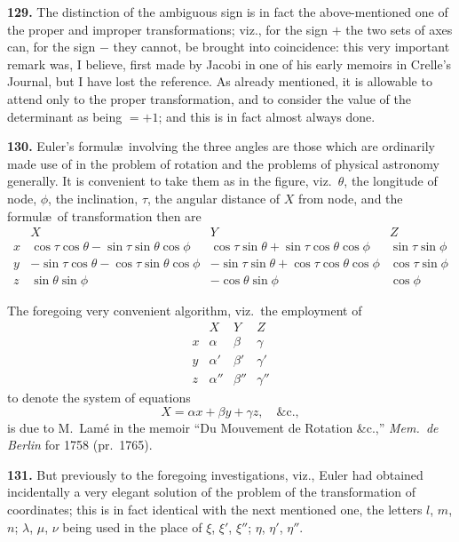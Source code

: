 \documentclass[11pt,a4paper]{article}
\theoremstyle{definition}
\begin{document}
\textbf{129.} The distinction of the ambiguous sign is in fact the above-mentioned one of the proper and improper transformations; viz., for the sign $+$ the two sets of axes can, for the sign $-$ they cannot, be brought into coincidence: this very important remark was, I believe, first made by Jacobi in one of his early memoirs in Crelle's Journal, but I have lost the reference. As already mentioned, it is allowable to attend only to the proper transformation, and to consider the value of the determinant as being $= +1$; and this is in fact almost always done.

\textbf{130.} Euler's formul\ae\ involving the three angles are those which are ordinarily made use of in the problem of rotation and the problems of physical astronomy generally. It is convenient to take them as in the figure, viz.\ $\theta$, the longitude of node, $\phi$, the inclination, $\tau$, the angular distance of $X$ from node, and the formul\ae\ of transformation then are
\[
\begin{array}{c|ccc}
& X & Y & Z \\ \hline
x & \cos\tau\cos\theta - \sin\tau\sin\theta\cos\phi & \cos\tau\sin\theta + \sin\tau\cos\theta\cos\phi & \sin\tau\sin\phi \\
y & -\sin\tau\cos\theta - \cos\tau\sin\theta\cos\phi & -\sin\tau\sin\theta + \cos\tau\cos\theta\cos\phi & \cos\tau\sin\phi \\
z & \sin\theta\sin\phi & -\cos\theta\sin\phi & \cos\phi
\end{array}
\]

The foregoing very convenient algorithm, viz.\ the employment of
\[
\begin{array}{c|ccc}
& X & Y & Z \\ \hline
x & \alpha & \beta & \gamma \\
y & \alpha' & \beta' & \gamma' \\
z & \alpha'' & \beta'' & \gamma''
\end{array}
\]
to denote the system of equations
\[
X = \alpha x + \beta y + \gamma z, \quad \&\text{c.},
\]
is due to M.~Lam\'e in the memoir ``Du Mouvement de Rotation \&c.,'' \textit{Mem.\ de Berlin} for 1758 (pr.~1765).

\textbf{131.} But previously to the foregoing investigations, viz., Euler had obtained incidentally a very elegant solution of the problem of the transformation of coordinates; this is in fact identical with the next mentioned one, the letters $l$, $m$, $n$; $\lambda$, $\mu$, $\nu$ being used in the place of $\xi$, $\xi'$, $\xi''$; $\eta$, $\eta'$, $\eta''$.
\end{document}

